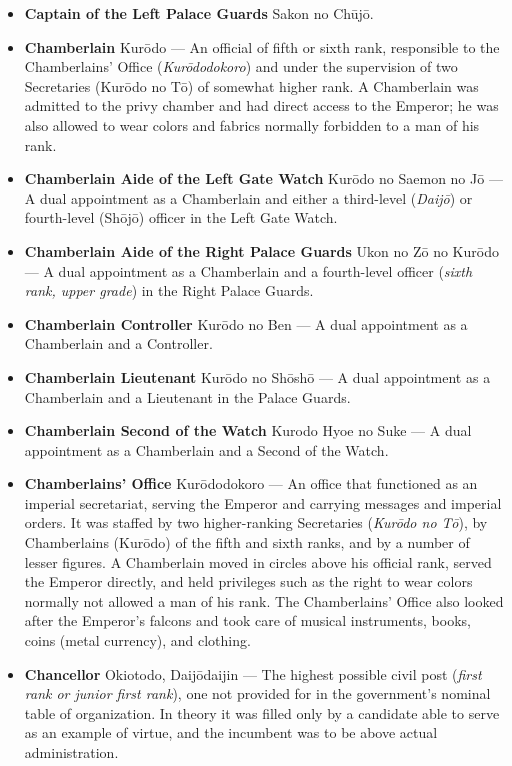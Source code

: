 \documentclass{article}
\begin{document}
\begin{multicols}{2}
\begin{small}
\begin{itemize}[
				label=,
				leftmargin=0em,
				rightmargin=-1.5em,
				itemindent=-2em,
			]
			\item \textbf{Captain of the Left Palace Guards} Sakon no Chūjō.

			\item \textbf{Chamberlain} Kurōdo --- An official of fifth or sixth rank, responsible to the Chamberlains' Office (\textit{Kurōdodokoro}) and under the supervision of two Secretaries (Kurōdo no Tō) of somewhat higher rank. A Chamberlain was admitted to the privy chamber and had direct access to the Emperor; he was also allowed to wear colors and fabrics normally forbidden to a man of his rank.

			\item \textbf{Chamberlain Aide of the Left Gate Watch} Kurōdo no Saemon no Jō --- A dual appointment as a Chamberlain and either a third-level (\textit{Daijō}) or fourth-level (Shōjō) officer in the Left Gate Watch.

			\item \textbf{Chamberlain Aide of the Right Palace Guards} Ukon no Zō no Kurōdo --- A dual appointment as a Chamberlain and a fourth-level officer (\textit{sixth rank, upper grade}) in the Right Palace Guards.

			\item \textbf{Chamberlain Controller} Kurōdo no Ben --- A dual appointment as a Chamberlain and a Controller.

			\item \textbf{Chamberlain Lieutenant} Kurōdo no Shōshō --- A dual appointment as a Chamberlain and a Lieutenant in the Palace Guards.

			\item \textbf{Chamberlain Second of the Watch} Kurodo Hyoe no Suke --- A dual appointment as a Chamberlain and a Second of the Watch.

			\item \textbf{Chamberlains' Office} Kurōdodokoro --- An office that functioned as an imperial secretariat, serving the Emperor and carrying messages and imperial orders. It was staffed by two higher-ranking Secretaries (\textit{Kurōdo no Tō}), by Chamberlains (Kurōdo) of the fifth and sixth ranks, and by a number of lesser figures. A Chamberlain moved in circles above his official rank, served the Emperor directly, and held privileges such as the right to wear colors normally not allowed a man of his rank. The Chamberlains' Office also looked after the Emperor's falcons and took care of musical instruments, books, coins (metal currency), and clothing.

			\item \textbf{Chancellor} Okiotodo, Daijōdaijin --- The highest possible civil post (\textit{first rank or junior first rank}), one not provided for in the government's nominal table of organization. In theory it was filled only by a candidate able to serve as an example of virtue, and the incumbent was to be above actual administration.


\end{itemize}
\end{small}
\end{multicols}
\end{document}
